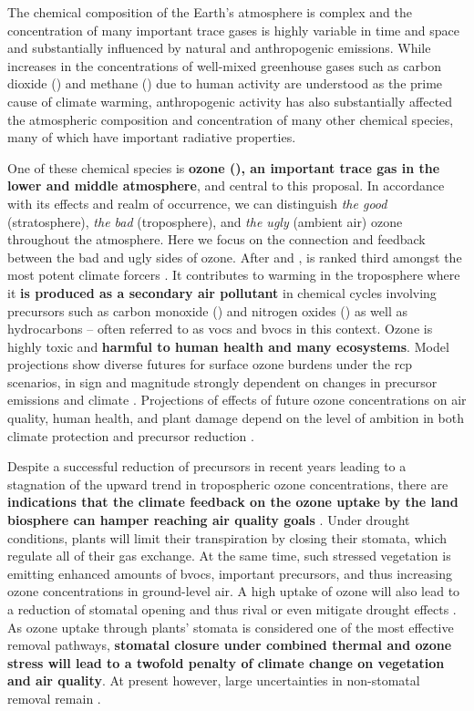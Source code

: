 The chemical composition of the Earth's atmosphere is complex and the concentration of many important trace gases is highly variable in time and space and substantially influenced by natural and anthropogenic emissions. While increases in the concentrations of well-mixed greenhouse gases such as carbon dioxide () and methane () due to human activity are understood as the prime cause of climate warming, anthropogenic activity has also substantially affected the atmospheric composition and concentration of many other chemical species, many of which have important radiative properties.

One of these chemical species is \textbf{ozone (), an important trace gas in the lower and middle atmosphere}, and central to this proposal. In accordance with its effects and realm of occurrence, we can distinguish \emph{the good} (stratosphere), \emph{the bad} (troposphere), and \emph{the ugly} (ambient air) ozone throughout the atmosphere. Here we focus on the connection and feedback between the bad and ugly sides of ozone. After  and ,  is ranked third amongst the most potent climate forcers \parencite{IPCC2013c8}.
It contributes to warming in the troposphere where it \textbf{is produced as a secondary air pollutant} in chemical cycles involving precursors such as carbon monoxide () and nitrogen oxides () as well as hydrocarbons -- often referred to as \glspl{voc} and \glspl{bvoc} in this context. Ozone is highly toxic and \textbf{harmful to human health and many ecosystems}. Model projections show diverse futures for surface ozone burdens under the \gls{rcp} scenarios, in sign and magnitude strongly dependent on changes in precursor emissions and climate \parencites{JAWMA:Fiore215}{JGR:Rieder2015}{AE:Rieder2018}{Nat:Skeie2020}. Projections of effects of future ozone concentrations on air quality, human health, and plant damage depend on the level of ambition in both climate protection and precursor reduction \parencite{PTRS:Schneidemesser2020}.

Despite a successful reduction of precursors in recent years leading to a stagnation of the upward trend in tropospheric ozone concentrations, there are \textbf{indications that the climate feedback on the ozone uptake by the land biosphere can hamper reaching air quality goals} \parencite{NCC:Lin2020}. Under drought conditions, plants will limit their transpiration by closing their stomata, which regulate all of their gas exchange. At the same time, such stressed vegetation is emitting enhanced amounts of \glspl{bvoc},  important  precursors, and thus increasing ozone concentrations \ch{[O_3]} in ground-level air. A high uptake of ozone will also lead to a reduction of stomatal opening and thus rival or even mitigate drought effects \parencite{BGS:Peron2021}. As ozone uptake through plants’ stomata is considered one of the most effective removal pathways, \textbf{stomatal closure under combined thermal and ozone stress will lead to a twofold penalty of climate change on vegetation and air quality}. At present however, large uncertainties in non-stomatal removal remain \parencite{RG:Clifton2020}.

